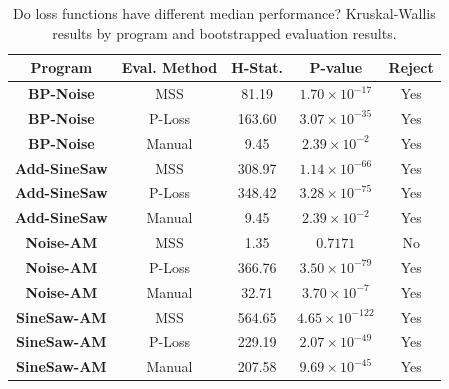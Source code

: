 \documentclass[lettersize,journal]{IEEEtran}
\newcommand{\BPNoise}{\textbf{BP-Noise}}
\newcommand{\AddSineSaw}{\textbf{Add-SineSaw}}
\newcommand{\AmpMod}{\textbf{Noise-AM}}
\newcommand{\FMMod}{\textbf{SineSaw-AM}}
\begin{document}
\begin{table}[ht]
\centering
\caption{Do loss functions have different median performance? Kruskal-Wallis results by program and bootstrapped evaluation results.}
\begin{tabular}{|c|c|c|c|c|}
\hline
\textbf{Program} & \textbf{Eval. Method} & \textbf{H-Stat.} & \textbf{P-value} & \textbf{Reject} \\
\hline
\BPNoise & MSS      & 81.19  & $1.70 \times 10^{-17}$ & Yes \\
\BPNoise & P-Loss  & 163.60 & $3.07 \times 10^{-35}$ & Yes \\
\BPNoise & Manual & 9.45  & $2.39 \times 10^{-2}$ & Yes \\
\AddSineSaw & MSS      & 308.97 & $1.14 \times 10^{-66}$ & Yes \\
\AddSineSaw & P-Loss  & 348.42 & $3.28 \times 10^{-75}$ & Yes \\
\AddSineSaw & Manual & 9.45  & $2.39 \times 10^{-2}$ & Yes \\
\AmpMod & MSS      & 1.35   & $0.7171$               & No \\
\AmpMod & P-Loss  & 366.76 & $3.50 \times 10^{-79}$ & Yes \\
\AmpMod & Manual & 32.71 & $3.70 \times 10^{-7}$ & Yes \\
\FMMod & MSS      & 564.65 & $4.65 \times 10^{-122}$ & Yes \\
\FMMod & P-Loss  & 229.19 & $2.07 \times 10^{-49}$ & Yes \\
\FMMod & Manual &  207.58 & $9.69 \times 10^{-45}$ & Yes \\
\hline
\end{tabular}
\label{tab:kruskal_auto}
\end{table}

\end{document}
